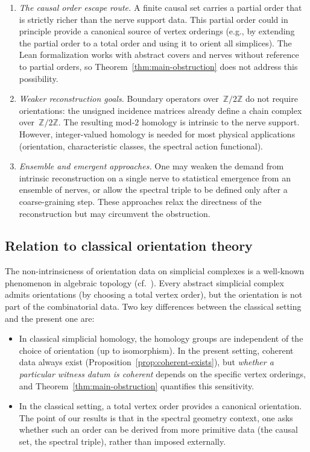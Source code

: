 \documentclass[11pt,a4paper]{article}
\theoremstyle{plain}
\theoremstyle{definition}
\theoremstyle{remark}
\newcommand{\ZZ}{\mathbb{Z}}
\begin{document}
\begin{enumerate}[nosep]
  \item \emph{The causal order escape route.}
    A finite causal set carries a partial order that is strictly richer
    than the nerve support data. This partial order could in principle
    provide a canonical source of vertex orderings (e.g., by extending
    the partial order to a total order and using it to orient all
    simplices). The Lean formalization works with abstract covers and
    nerves without reference to partial orders, so
    Theorem~\ref{thm:main-obstruction} does not address this possibility.

  \item \emph{Weaker reconstruction goals.}
    Boundary operators over~$\ZZ/2\ZZ$ do not require orientations:
    the unsigned incidence matrices already define a chain complex
    over~$\ZZ/2\ZZ$. The resulting mod-$2$ homology is intrinsic to
    the nerve support. However, integer-valued homology is needed for
    most physical applications (orientation, characteristic classes,
    the spectral action functional).

  \item \emph{Ensemble and emergent approaches.}
    One may weaken the demand from intrinsic reconstruction on a single
    nerve to statistical emergence from an ensemble of nerves, or allow
    the spectral triple to be defined only after a coarse-graining step.
    These approaches relax the directness of the reconstruction but
    may circumvent the obstruction.
\end{enumerate}

\subsection{Relation to classical orientation theory}

The non-intrinsicness of orientation data on simplicial complexes is
a well-known phenomenon in algebraic topology
(cf.~\cite{Hatcher:2002,Munkres:1984}). Every abstract simplicial
complex admits orientations (by choosing a total vertex order), but the
orientation is not part of the combinatorial data. Two key differences
between the classical setting and the present one are:

\begin{itemize}[nosep]
  \item In classical simplicial homology, the homology groups are
        independent of the choice of orientation (up to isomorphism).
        In the present setting, coherent data always exist
        (Proposition~\ref{prop:coherent-exists}), but \emph{whether
        a particular witness datum is coherent} depends on the specific
        vertex orderings, and Theorem~\ref{thm:main-obstruction}
        quantifies this sensitivity.

  \item In the classical setting, a total vertex order provides a
        canonical orientation. The point of our results is that in
        the spectral geometry context, one asks whether such an order
        can be derived from more primitive data (the causal set, the
        spectral triple), rather than imposed externally.
\end{itemize}
\end{document}
